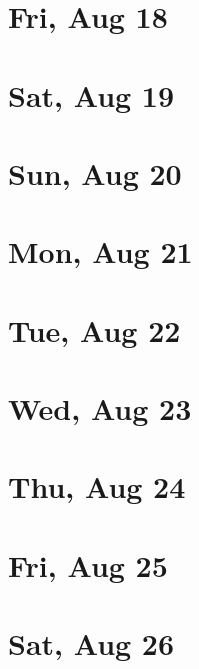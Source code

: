 	\section{Fri, Aug 18}
		
		
	\section{Sat, Aug 19}
		
		
	\section{Sun, Aug 20}
		
		
	\section{Mon, Aug 21}
		
		
	\section{Tue, Aug 22}
		
		
	\section{Wed, Aug 23}
		
		
	\section{Thu, Aug 24}
		
		
	\section{Fri, Aug 25}
		
		
	\section{Sat, Aug 26}
		
		
